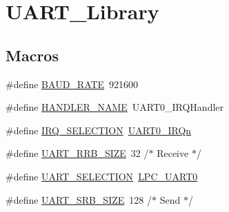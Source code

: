 \hypertarget{group__UART__Library}{}\section{U\+A\+R\+T\+\_\+\+Library}
\label{group__UART__Library}
\subsection*{Macros}
\begin{DoxyCompactItemize}
\item 
\#define \hyperlink{group__UART__Library_gad4455691936f92fdd6c37566fc58ba1f}{B\+A\+U\+D\+\_\+\+R\+A\+TE}~921600
\item 
\#define \hyperlink{group__UART__Library_gafa87a27ed6f715eb90d4db80687e93bf}{H\+A\+N\+D\+L\+E\+R\+\_\+\+N\+A\+ME}~U\+A\+R\+T0\+\_\+\+I\+R\+Q\+Handler
\item 
\#define \hyperlink{group__UART__Library_ga7c3d3b9d5cf2685f7fdb298eaf359875}{I\+R\+Q\+\_\+\+S\+E\+L\+E\+C\+T\+I\+ON}~\hyperlink{group__CMSIS__175X__6X__IRQ_ggaaaeafe7bd8401a46d55e8431b6326116ae9122b85b58f7c24033a8515615a7b74}{U\+A\+R\+T0\+\_\+\+I\+R\+Qn}
\item 
\#define \hyperlink{group__UART__Library_gaf9c71990720971fa35b971b5e305c05b}{U\+A\+R\+T\+\_\+\+R\+R\+B\+\_\+\+S\+I\+ZE}~32	/$\ast$ Receive $\ast$/
\item 
\#define \hyperlink{group__UART__Library_ga43200fe4a9ea07a8a7f41b484fce9a18}{U\+A\+R\+T\+\_\+\+S\+E\+L\+E\+C\+T\+I\+ON}~\hyperlink{group__PERIPH__407X__8X__BASE_ga6ba29f0f9b8af2f72e303533185bcc82}{L\+P\+C\+\_\+\+U\+A\+R\+T0}
\item 
\#define \hyperlink{group__UART__Library_ga5fe77d3c1b35665239feac7a45b514a6}{U\+A\+R\+T\+\_\+\+S\+R\+B\+\_\+\+S\+I\+ZE}~128	/$\ast$ Send $\ast$/
\end{DoxyCompactItemize}
